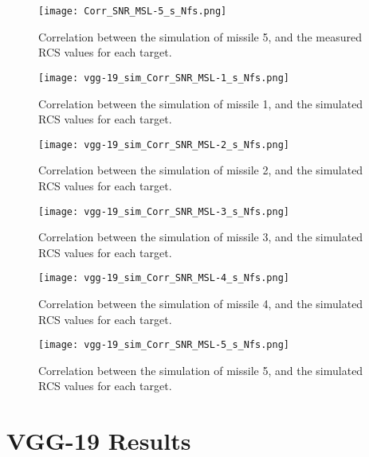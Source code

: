   \begin{figure}[htbp!]
    \centering
    \texttt{[image: Corr\_SNR\_MSL-5\_s\_Nfs.png]}
    \caption[Missile 1 Correlations (Sim/Sim)]{Correlation between the simulation of missile 5, and the measured RCS values for each target.}
    \label{fig:corr_msl5}
  \end{figure}

  \begin{figure}[htbp!]
    \centering
    \texttt{[image: vgg-19\_sim\_Corr\_SNR\_MSL-1\_s\_Nfs.png]}
    \caption[Missile 1 Correlations (Sim/Sim)]{Correlation between the simulation of missile 1, and the simulated RCS values for each target.}
    \label{fig:corr_msl1_sim}
  \end{figure}

  \begin{figure}[htbp!]
    \centering
    \texttt{[image: vgg-19\_sim\_Corr\_SNR\_MSL-2\_s\_Nfs.png]}
    \caption[Missile 1 Correlations (Sim/Sim)]{Correlation between the simulation of missile 2, and the simulated RCS values for each target.}
    \label{fig:corr_msl2_sim}
  \end{figure}

  \begin{figure}[htbp!]
    \centering
    \texttt{[image: vgg-19\_sim\_Corr\_SNR\_MSL-3\_s\_Nfs.png]}
    \caption[Missile 1 Correlations (Sim/Sim)]{Correlation between the simulation of missile 3, and the simulated RCS values for each target.}
    \label{fig:corr_msl3_sim}
  \end{figure}

  \begin{figure}[htbp!]
    \centering
    \texttt{[image: vgg-19\_sim\_Corr\_SNR\_MSL-4\_s\_Nfs.png]}
    \caption[Missile 1 Correlations (Sim/Sim)]{Correlation between the simulation of missile 4, and the simulated RCS values for each target.}
    \label{fig:corr_msl4_sim}
  \end{figure}

  \begin{figure}[htbp!]
    \centering
    \texttt{[image: vgg-19\_sim\_Corr\_SNR\_MSL-5\_s\_Nfs.png]}
    \caption[Missile 1 Correlations (Sim/Sim)]{Correlation between the simulation of missile 5, and the simulated RCS values for each target.}
    \label{fig:corr_msl5_sim}
  \end{figure}

\chapter{VGG-19 Results}
\label{app:vgg-19_results}

